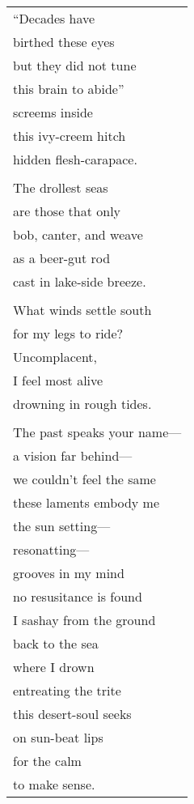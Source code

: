 \documentclass{article}
\begin{document}
\begin{center}
\textbf{} \\
\vspace*{2ex}
\begin{tabular}{l}
``Decades have \\
birthed these eyes \\
but they did not tune \\
this brain to abide'' \\
\hspace*{2em}screems inside \\
this ivy-creem hitch \\
\hspace*{2em}hidden flesh-carapace. \\
\\
The drollest seas \\
are those that only \\
bob, canter, and weave \\
as a beer-gut rod \\ %
cast in lake-side breeze. \\
\\
What winds settle south \\
for my legs to ride? \\
\hspace*{2em}Uncomplacent, \\
I feel most alive \\
drowning in rough tides. \\
\\
The past speaks your name--- \\
\hspace*{2em}a vision far behind--- \\
\hspace*{4em}we couldn't feel the same \\
these laments embody me \\
\hspace*{2em}the sun setting---\\
\hspace*{4em}resonatting--- \\
grooves in my mind \\
no resusitance is found \\
I sashay from the ground \\
back to the sea \\
where I drown \\
entreating the trite \\
this desert-soul seeks \\
on sun-beat lips \\
for the calm \\
to make sense. \\
\end{tabular}
\end{center}
\end{document}
